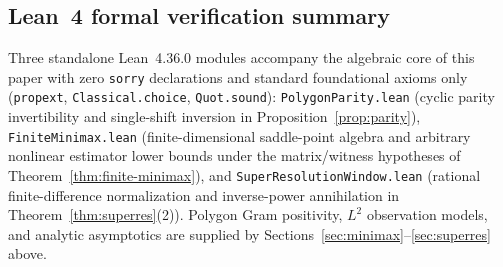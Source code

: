 \documentclass[11pt,reqno]{amsart}
\theoremstyle{definition}
\theoremstyle{remark}
\begin{document}
\subsection*{Lean~4 formal verification summary}
Three standalone Lean~4.36.0 modules accompany the algebraic core of this paper with zero \texttt{sorry} declarations and standard foundational axioms only (\texttt{propext}, \texttt{Classical.choice}, \texttt{Quot.sound}): \texttt{PolygonParity.lean} (cyclic parity invertibility and single-shift inversion in Proposition~\ref{prop:parity}), \texttt{FiniteMinimax.lean} (finite-dimensional saddle-point algebra and arbitrary nonlinear estimator lower bounds under the matrix/witness hypotheses of Theorem~\ref{thm:finite-minimax}), and \texttt{SuperResolutionWindow.lean} (rational finite-difference normalization and inverse-power annihilation in Theorem~\ref{thm:superres}(2)). Polygon Gram positivity, $L^2$ observation models, and analytic asymptotics are supplied by Sections~\ref{sec:minimax}--\ref{sec:superres} above.
\end{document}
